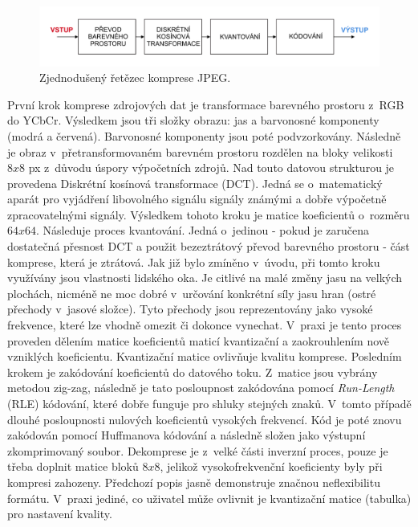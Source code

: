 \begin{figure}[hbt!]
  \hspace*{-0.5cm}
  \includegraphics[width=16cm]{obrazky-figures/Artboard.pdf}
  \caption{Zjednodušený řetězec komprese JPEG.}
  \label{retezec}
\end{figure}
 První krok komprese zdrojových dat je transformace barevného prostoru z~RGB do YCbCr. Výsledkem jsou tři složky obrazu: jas a barvonosné komponenty (modrá a červená). Barvonosné komponenty jsou poté podvzorkovány. Následně je obraz v~přetransformovaném barevném prostoru rozdělen na bloky velikosti $8x8$ px z~důvodu úspory výpočetních zdrojů. Nad touto datovou strukturou je provedena Diskrétní kosínová transformace (DCT). Jedná se o~matematický aparát pro vyjádření libovolného signálu signály známými a dobře výpočetně zpracovatelnými signály. Výsledkem tohoto kroku je matice koeficientů o~rozměru $64x64$. Následuje proces kvantování. Jedná o~jedinou - pokud je zaručena dostatečná přesnost DCT a použit bezeztrátový převod barevného prostoru - část komprese, která je ztrátová. Jak již bylo zmíněno v~úvodu, při tomto kroku využívány jsou vlastnosti lidského oka. Je citlivé na malé změny jasu na velkých plochách, nicméně ne moc dobré v~určování konkrétní síly jasu hran (ostré přechody v~jasové složce). Tyto přechody jsou reprezentovány jako vysoké frekvence, které lze vhodně omezit či dokonce vynechat. V~praxi je tento proces proveden dělením matice koeficientů maticí kvantizační a zaokrouhlením nově vzniklých koeficientu. Kvantizační matice ovlivňuje kvalitu komprese. Posledním krokem je zakódování koeficientů do datového toku. Z~matice jsou vybrány metodou zig-zag, následně je tato posloupnost zakódována pomocí \textit{Run-Length} (RLE) kódování, které dobře funguje pro shluky stejných znaků. V~tomto případě dlouhé posloupnosti nulových koeficientů vysokých frekvencí. Kód je poté znovu zakódován pomocí Huffmanova kódování a následně složen jako výstupní zkomprimovaný soubor.
Dekomprese je z~velké části inverzní proces, pouze je třeba doplnit matice bloků $8x8$, jelikož vysokofrekvenční koeficienty byly při kompresi zahozeny. Předchozí popis jasně demonstruje značnou neflexibilitu formátu. V~praxi jediné, co uživatel může ovlivnit je kvantizační matice (tabulka) pro nastavení kvality. 


